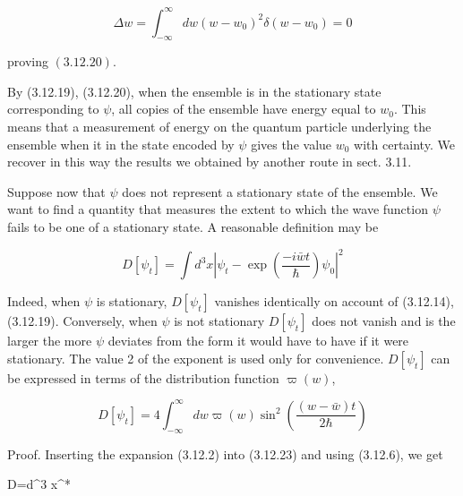 \documentclass{article}
\begin{document}
\begin{equation*}
\Delta w=\int_{-\infty}^{\infty} d w\left(w-w_{0}\right)^{2} \delta\left(w-w_{0}\right)=0 \tag{3.12.22}
\end{equation*}
 
proving $(3.12 .20)$.

By (3.12.19), (3.12.20), when the ensemble is in the stationary state corresponding to $\psi$, all copies of the ensemble have energy equal to $w_{0}$. This means that a measurement of energy on the quantum particle underlying the ensemble when it in the state encoded by $\psi$ gives the value $w_{0}$ with certainty. We recover in this way the results we obtained by another route in sect. 3.11.

Suppose now that $\psi$ does not represent a stationary state of the ensemble. We want to find a quantity that measures the extent to which the wave function $\psi$ fails to be one of a stationary state. A reasonable definition may be
 
\begin{equation*}
D\left[\psi_{t}\right]=\int d^{3} x\left|\psi_{t}-\exp \left(\frac{-i \bar{w} t}{\hbar}\right) \psi_{0}\right|^{2} \tag{3.12.23}
\end{equation*}
 

Indeed, when $\psi$ is stationary, $D\left[\psi_{t}\right]$ vanishes identically on account of (3.12.14), (3.12.19). Conversely, when $\psi$ is not stationary $D\left[\psi_{t}\right]$ does not vanish and is the larger the more $\psi$ deviates from the form it would have to have if it were stationary. The value 2 of the exponent is used only for convenience. $D\left[\psi_{t}\right]$ can be expressed in terms of the distribution function $\varpi(w)$,
 
\begin{equation*}
D\left[\psi_{t}\right]=4 \int_{-\infty}^{\infty} d w \varpi(w) \sin ^{2}\left(\frac{(w-\bar{w}) t}{2 \hbar}\right) \tag{3.12.24}
\end{equation*}
 

Proof. Inserting the expansion (3.12.2) into (3.12.23) and using (3.12.6), we get
 
D=\int d^{3} x^{*}
 
\end{document}
